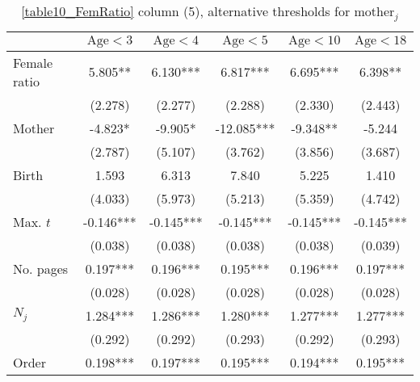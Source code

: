 \begin{table}[H]
    \footnotesize
    \centering
    \begin{threeparttable}
        \caption{\autoref{table10_FemRatio} column (5), alternative thresholds for \(\text{mother}_j\)}
        \label{table10_thresholds}
        \begin{tabular}{p{4cm}SSSSS}
            \toprule
            &{\(\text{Age}<3\)}&{\(\text{Age}<4\)}&{\(\text{Age}<5\)}&{\(\text{Age}<10\)}&{\(\text{Age}<18\)}\\
            \midrule
            Female ratio                  &       5.805** &       6.130***&       6.817***&       6.695***&       6.398** \\
                                          &     (2.278)   &     (2.277)   &     (2.288)   &     (2.330)   &     (2.443)   \\
            Mother                        &      -4.823*  &      -9.905*  &     -12.085***&      -9.348** &      -5.244   \\
                                          &     (2.787)   &     (5.107)   &     (3.762)   &     (3.856)   &     (3.687)   \\
            Birth                         &       1.593   &       6.313   &       7.840   &       5.225   &       1.410   \\
                                          &     (4.033)   &     (5.973)   &     (5.213)   &     (5.359)   &     (4.742)   \\
            Max. \(t\)                    &      -0.146***&      -0.145***&      -0.145***&      -0.145***&      -0.145***\\
                                          &     (0.038)   &     (0.038)   &     (0.038)   &     (0.038)   &     (0.039)   \\
            No. pages                     &       0.197***&       0.196***&       0.195***&       0.196***&       0.197***\\
                                          &     (0.028)   &     (0.028)   &     (0.028)   &     (0.028)   &     (0.028)   \\
            \(N_j\)                       &       1.284***&       1.286***&       1.280***&       1.277***&       1.277***\\
                                          &     (0.292)   &     (0.292)   &     (0.293)   &     (0.292)   &     (0.293)   \\
            Order                         &       0.198***&       0.197***&       0.195***&       0.194***&       0.195***\\

\end{tabular}
\end{threeparttable}
\end{table}
